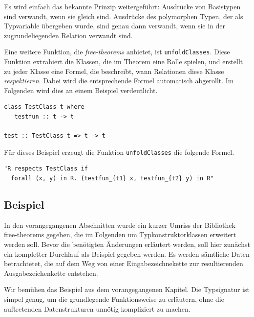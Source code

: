 Es wird einfach das bekannte Prinzip weitergeführt: Ausdrücke von Basistypen sind verwandt, wenn sie gleich sind. Ausdrücke
des polymorphen Typen, der als Typvariable übergeben wurde, sind genau dann verwandt, wenn sie in der zugrundeliegenden
Relation verwandt sind.

Eine weitere Funktion, die \textit{free-theorems} anbietet, ist \texttt{unfoldClasses}. Diese Funktion extrahiert die Klassen,
die im Theorem eine Rolle spielen, und erstellt zu jeder Klasse eine Formel, die beschreibt, wann Relationen diese Klasse
\textit{respektieren}. Dabei wird die entsprechende Formel automatisch abgerollt. Im Folgenden wird dies an einem Beispiel
verdeutlicht.

\begin{verbatim}
class TestClass t where
   testfun :: t -> t

test :: TestClass t => t -> t
\end{verbatim}

Für dieses Beispiel erzeugt die Funktion \texttt{unfoldClasses} die folgende Formel.

\begin{verbatim}
"R respects TestClass if
  forall (x, y) in R. (testfun_{t1} x, testfun_{t2} y) in R"
\end{verbatim}

\subsection{Beispiel}

\label{sec:free-theorems-beispiel}

In den vorangegangenen Abschnitten wurde ein kurzer Umriss der Bibliothek free-theorems gegeben, die im Folgenden um
Typkonstruktorklassen erweitert werden soll. Bevor die benötigten Änderungen erläutert werden, soll hier zunächst ein
kompletter Durchlauf als Beispiel gegeben werden. Es werden sämtliche Daten betrachtetet, die auf dem Weg von einer
Eingabezeichnekette zur resultierenden Ausgabezeichenkette entstehen.


Wir bemühen das Beispiel aus dem vorangegangenen Kapitel. Die Typsignatur ist simpel genug,
um die grundlegende Funktionsweise zu erläutern, ohne die auftretenden Datenstrukturen unnötig kompliziert zu machen.

